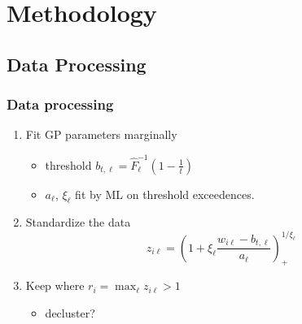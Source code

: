 \documentclass[aspectratio=169]{beamer}
\begin{document}
\section{Methodology}
\subsection{Data Processing}
\begin{frame}
  \frametitle{Data processing}
  \begin{enumerate}
    \item Fit GP parameters marginally
      \begin{itemize}
        \item threshold $b_{t,\ell} = \hat{F}_{\ell}^{-1}\left(1 - \frac{1}{t}\right)$
        \item $a_{\ell}$, $\xi_{\ell}$ fit by ML on threshold exceedences.
      \end{itemize}
    \item Standardize the data
      \[
        z_{i\ell} = \left(1 + \xi_{\ell}\frac{w_{i\ell} -
         b_{t,\ell}}{a_{\ell}}\right)_{+}^{1/\xi_{\ell}}
      \]
    \item Keep where $r_i = \max_{\ell}z_{i\ell} > 1$
    \begin{itemize}
      \item decluster?
    \end{itemize}
  \end{enumerate}
\end{frame}
\end{document}
